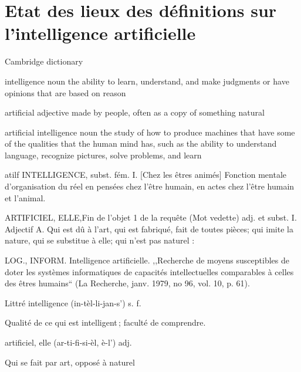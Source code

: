 \section{Etat des lieux des définitions sur l'intelligence artificielle}\label{appendice:definition-ia}
Cambridge dictionary


intelligence
noun
the ability to learn, understand, and make judgments or have opinions that are based on reason

artificial
adjective
made by people, often as a copy of something natural

artificial intelligence
noun
the study of how to produce machines that have some of the qualities that the human mind has, such as the ability to understand language, recognize pictures, solve problems, and learn


atilf
INTELLIGENCE, subst. fém.
I. [Chez les êtres animés] Fonction mentale d'organisation du réel en pensées chez l'être humain, en actes chez l'être humain et l'animal.

ARTIFICIEL, ELLE,Fin de l'objet 1 de la requête (Mot vedette) adj. et subst.
I. Adjectif
A. Qui est dû à l'art, qui est fabriqué, fait de toutes pièces; qui imite la nature, qui se substitue à elle; qui n'est pas naturel :

LOG., INFORM. Intelligence artificielle. ,,Recherche de moyens susceptibles de doter les systèmes informatiques de capacités intellectuelles comparables à celles des êtres humains`` (La Recherche, janv. 1979, no 96, vol. 10, p. 61).


Littré
intelligence
(in-tèl-li-jan-s') s. f.

Qualité de ce qui est intelligent ; faculté de comprendre.

artificiel, elle
(ar-ti-fi-si-èl, è-l') adj.

Qui se fait par art, opposé à naturel

\pagebreak
